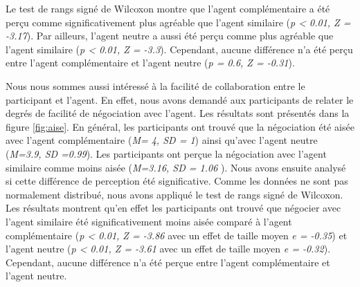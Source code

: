 	
	Le test de rangs signé de Wilcoxon montre que l'agent complémentaire a été perçu comme significativement plus agréable que l'agent similaire (\emph{p < 0.01, Z = -3.17}). Par ailleurs, l'agent neutre a aussi été perçu comme plus agréable que l'agent similaire (\emph{p < 0.01, Z = -3.3}). Cependant, aucune différence n'a été perçu entre l'agent complémentaire et l'agent neutre (\emph{p = 0.6, Z = -0.31}).
	
	Nous nous sommes aussi intéressé à la facilité de collaboration entre le participant et l'agent. En effet, nous avons demandé aux participants de relater le degrés de facilité de négociation avec l'agent. Les résultats sont présentés dans la figure \ref{fig:aise}. En général, les participants ont trouvé que la négociation été aisée avec l'agent complémentaire (\emph{M= 4, SD = 1}) ainsi qu'avec l'agent neutre (\emph{M=3.9, SD =0.99}). Les participants ont perçue la négociation avec l'agent similaire comme moins aisée (\emph{M=3.16, SD = 1.06 }). 
	Nous avons ensuite analysé si cette différence de perception été significative. Comme les données ne sont pas normalement distribué, nous avons appliqué le test de rangs signé de Wilcoxon. Les résultats montrent qu'en effet les participants ont trouvé que négocier avec l'agent similaire été significativement moins aisée comparé à l'agent complémentaire (\emph{p < 0.01, Z = -3.86} avec un effet de taille moyen \emph{e = -0.35}) et l'agent neutre (\emph{p < 0.01, Z = -3.61} avec un effet de taille moyen \emph{e = -0.32}).
	Cependant, aucune différence n'a été perçue entre l'agent complémentaire et l'agent neutre.
